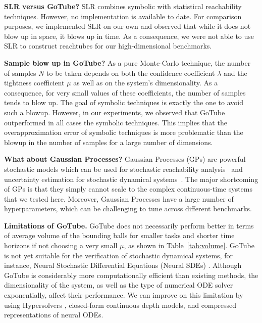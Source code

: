 \documentclass[letterpaper]{article} %
\begin{document}
\noindent\textbf{SLR versus GoTube?} SLR combines symbolic with statistical reachability techniques. However, no implementation is available to date. For comparison purposes, we implemented SLR on our own and observed that while it does not blow up in space, it blows up in time. As a consequence, we were not able to use SLR to construct reachtubes for our high-dimensional benchmarks.

\noindent\textbf{Sample blow up in GoTube?}
As a pure Monte-Carlo technique, the number of samples $N$ to be taken depends on both the confidence coefficient $\lambda$ and the tightness coefficient $\mu$ as well as on the system's dimensionality. As a consequence, for very small values of these coefficients, the number of samples tends to blow up. The goal of symbolic techniques is exactly the one to avoid such a blowup. However, in our experiments, we observed that GoTube outperformed in all cases the symbolic techniques. This implies that the overapproximation error of symbolic techniques is more problematic than the blowup in the number of samples for a large number of dimensions.

\noindent\textbf{What about Gaussian Processes?} Gaussian Processes (GPs) are powerful stochastic models which can be used for stochastic reachability analysis~\cite{gp} and uncertainty estimation for stochastic dynamical systems~\cite{gal2016uncertainty}. The major shortcoming of GPs is that they simply cannot scale to the complex continuous-time systems that we tested here. Moreover, Gaussian Processes have a large number of hyperparameters, which can be challenging to tune across different benchmarks. 

\noindent\textbf{Limitations of GoTube.} GoTube does not necessarily perform better in terms of average volume of the bounding balls for smaller tasks and shorter time horizons if not choosing a very small $\mu$, as shown in Table~\ref{tab:volume}. GoTube is not yet suitable for the verification of stochastic dynamical systems, for instance, Neural Stochastic Differential Equations (Neural SDEs) \cite{li2020scalable,xu2021infinitely}. Although GoTube is considerably more computationally efficient than existing methods, the dimensionality of the system, as well as the type of numerical ODE solver exponentially, affect their performance. We can improve on this limitation by using Hypersolvers \cite{poli2020hypersolvers}, closed-form continuous depth models, and compressed representations of neural ODEs.
\end{document}

